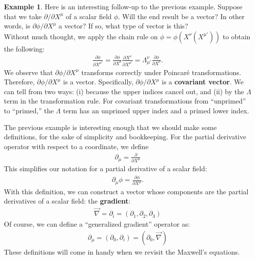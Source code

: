 \documentclass{article}
\theoremstyle{definition}
\newtheorem{exmp}{Example}[section]
\begin{document}
\begin{exmp}
	Here is an interesting follow-up to the previous example. Suppose that we take ${\partial }/{\partial X^\mu}$ of a scalar field $\phi$. Will the end result be a vector? In other words, is ${\partial \phi}/{\partial X^\mu}$ a vector? If so, what type of vector is this?\\
	
	Without much thought, we apply the chain rule on $\phi = \phi\left(X^{\nu}\left(X^{\mu'} \right)  \right) $ to obtain the following:
	\begin{align*}
	\frac{\partial \phi}{\partial X^{\mu'}} = \frac{\partial \phi}{\partial X^{\nu}}\frac{\partial X^\nu}{\partial X^{\mu'}} = \Lambda^\nu_{\mu'}\frac{\partial \phi}{\partial X^{\nu}}.
	\end{align*}
	We observe that $\partial \phi / \partial X^{\mu}$ transforms correctly under Poincar\'e transformations. Therefore, $\partial \phi / \partial X^{\mu}$ is a vector. Specifically, $\partial \phi / \partial X^{\mu}$ is a \textbf{covariant vector}. We can tell from two ways: (i) because the upper indices cancel out, and (ii) by the $\Lambda$ term in the transformation rule. For covariant transformations from ``unprimed'' to ``primed,'' the $\Lambda$ term has an unprimed upper index and a primed lower index.\\
\end{exmp}

The previous example is interesting enough that we should make some definitions, for the sake of simplicity and bookkeeping. For the partial derivative operator with respect to a coordinate, we define
\begin{align*}
\boxed{\partial_\mu = \frac{\partial }{\partial X^\mu}}
\end{align*}
This simplifies our notation for a partial derivative of a scalar field:
\begin{align*}
\partial_\mu \phi= \frac{\partial \phi}{\partial X^\mu}.
\end{align*}
With this definition, we can construct a vector whose components are the partial derivatives of a scalar field: the \textbf{gradient}:
\begin{align*}
\boxed{\vec{\nabla} = \partial_i = (\partial_1, \partial_2, \partial_3)}
\end{align*}
Of course, we can define a ``generalized gradient'' operator as:
\begin{align*}
\boxed{\partial_\mu = \left( \partial_0, \partial_i\right)  = \left( \partial_0, \vec{\nabla}\right) }
\end{align*}
These definitions will come in handy when we revisit the Maxwell's equations.\\
\end{document}
